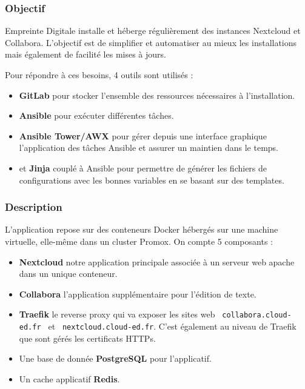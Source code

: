 \documentclass[12pt]{article}
\begin{document}
\subsubsection{Objectif}
Empreinte Digitale installe et héberge régulièrement des instances Nextcloud et Collabora. 
L'objectif est de simplifier et automatiser au mieux les installations mais également de facilité les mises à jours.

Pour répondre à ces besoins, 4 outils sont utilisés :
\begin{itemize}
    \item \textbf{GitLab} pour stocker l'ensemble des ressources nécessaires à l'installation.
    \item \textbf{Ansible} pour exécuter différentes tâches.
    \item \textbf{Ansible Tower/AWX} pour gérer depuis une interface graphique l'application des tâches Ansible et assurer un maintien dans le temps.
    \item et \textbf{Jinja} couplé à Ansible pour permettre de générer les fichiers de configurations avec les bonnes variables en se basant sur des templates.
\end{itemize}

\subsubsection{Description}
L'application repose sur des conteneurs Docker hébergés sur une machine virtuelle, elle-même dans un cluster Promox. On compte 5 composants :
\begin{itemize}
    \item \textbf{Nextcloud} notre application principale associée à un serveur web apache dans un unique conteneur.
    \item \textbf{Collabora} l'application supplémentaire pour l'édition de texte.
    \item \textbf{Traefik} le reverse proxy qui va exposer les sites web \verb| collabora.cloud-ed.fr | et  \verb| nextcloud.cloud-ed.fr|. 
    C'est également au niveau de Traefik que sont gérés les certificats HTTPs.
    \item Une base de donnée \textbf{PostgreSQL} pour l'applicatif.
    \item Un cache applicatif \textbf{Redis}.
\end{itemize}

\newpage
\end{document}
